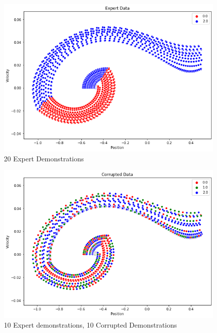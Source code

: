 \documentclass[11pt]{article}
\begin{document}
\begin{figure}[H]
    \centering
    \includegraphics[scale=0.5]{ExpertData.png}
    \caption{20 Expert Demonstrations}
    \label{Expert Data}
\end{figure}

\begin{figure}[H]
    \centering
    \includegraphics[scale=0.5]{CorruptedData.png}
    \caption{10 Expert demonstrations, 10 Corrupted Demonstrations}
    \label{CorruptedData}
\end{figure}
\end{document}
